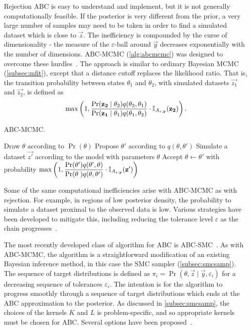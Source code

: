 Rejection \gls{ABC} is easy to understand and implement, but it is not
generally computationally feasible. If the posterior is very different from the
prior, a very large number of samples may need to be taken in order to find a
simulated dataset which is close to $\vec{z}$. The inefficiency is compounded
by the curse of dimensionality - the measure of the $\varepsilon$-ball around
$\vec{y}$ decreases exponentially with the number of dimensions.
\gls{ABC}-\gls{MCMC} (\cref{alg:abcmcmc}) was designed to overcome these
hurdles~\autocite{marjoram2003markov}. The approach is similar to ordinary
Bayesian \gls{MCMC} (\cref{subsec:mfit}), except that a distance cutoff
replaces the likelihood ratio. That is, the transition probability between
states $\theta_1$ and $\theta_2$, with simulated datasets $\vec{z_1}$ and
$\vec{z_2}$, is defined as
\[
  \max\left(1, \frac{\Pr(\mathbf{z_2} \mid \theta_2) q(\theta_2, \theta_1)}
                    {\Pr(\mathbf{z_1} \mid \theta_1) q(\theta_1, \theta_2)} 
    \cdot \mathbb{I}_{A_{\varepsilon, \mathbf{y}}}(\mathbf{z_2}) \right).
\]

\begin{algorithm}
  \caption{ABC-MCMC.}
  \begin{algorithmic}
    \State Draw $\theta$ according to $\Pr(\theta)$
    \Loop
      \State Propose $\theta'$ according to $q(\theta, \theta')$
      \State Simulate a dataset $\vec{z'}$ according to the model with
             parameters $\theta$
      \State Accept $\theta \gets \theta'$ with probability
      $\max \left( 1, 
       \dfrac{\Pr(\theta') q(\theta', \theta)}
             {\Pr(\theta\phantom{'}) q(\theta, \theta')} 
       \cdot \mathbb{I}_{A_{\varepsilon, \mathbf{y}}}(\mathbf{z'}) \right)$
    \EndLoop
  \end{algorithmic}
  \label{alg:abcmcmc}
\end{algorithm}

Some of the same computational inefficiencies arise with \gls{ABC}-\gls{MCMC}
as with rejection. For example, in regions of low posterior density, the
probability to simulate a dataset proximal to the observed data is low. Various
strategies have been developed to mitigate this, including reducing the
tolerance level $\varepsilon$ as the chain
progresses~\autocite{ratmann2007using}.

The most recently developed class of algorithm for \gls{ABC} is
\gls{ABC}-\gls{SMC}~\autocite{sisson2007sequential, beaumont2009adaptive}. As
with \gls{ABC}-\gls{MCMC}, the algorithm is a straightforward modification of
an existing Bayesian inference method, in this case the \gls{SMC} sampler
(\cref{subsec:smcsamp}). The sequence of target distributions is defined as
$\pi_i = \Pr(\theta, \vec{z} \mid \vec{y}, \varepsilon_i)$ for a decreasing
sequence of tolerances $\varepsilon_i$. The intention is for the algorithm to
progress smoothly through a sequence of target distributions which ends at the
\gls{ABC} approximation to the posterior. As discussed in
\cref{subsec:smcsamp}, the choices of the kernels $K$ and $L$ is
problem-specific, and so appropriate kernels must be chosen for \gls{ABC}.
Several options have been proposed~\autocite{beaumont2009adaptive,
sisson2007sequential, del2012adaptive}.

